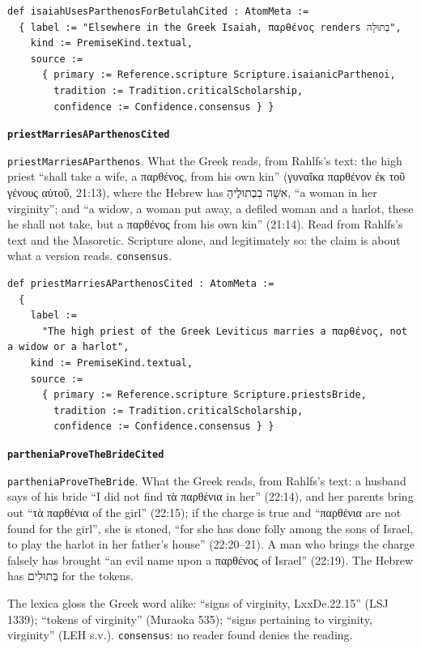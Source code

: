 \documentclass[11pt]{article}
\begin{document}
{\small\begin{verbatim}
def isaiahUsesParthenosForBetulahCited : AtomMeta :=
  { label := "Elsewhere in the Greek Isaiah, παρθένος renders בְּתוּלָה",
    kind := PremiseKind.textual,
    source :=
      { primary := Reference.scripture Scripture.isaianicParthenoi,
        tradition := Tradition.criticalScholarship,
        confidence := Confidence.consensus } }
\end{verbatim}}
\par\medskip\noindent\textbf{\texttt{priest\allowbreak{}Marries\allowbreak{}AParthenos\allowbreak{}Cited}}\par\nobreak\noindent
\texttt{priest\allowbreak{}Marries\allowbreak{}AParthenos}. What the Greek reads, from Rahlfs’s text: the high priest “shall take a wife, a παρθένος, from his own kin” (γυναῖκα παρθένον ἐκ τοῦ γένους αὐτοῦ, 21:13), where the Hebrew has אִשָּׁה בִבְתוּלֶיהָ, “a woman in her virginity”; and “a widow, a woman put away, a defiled woman and a harlot, these he shall not take, but a παρθένος from his own kin” (21:14). Read from Rahlfs’s text and the Masoretic. Scripture alone, and legitimately so: the claim is about what a version reads. \texttt{consensus}.

{\small\begin{verbatim}
def priestMarriesAParthenosCited : AtomMeta :=
  {
    label :=
      "The high priest of the Greek Leviticus marries a παρθένος, not a widow or a harlot",
    kind := PremiseKind.textual,
    source :=
      { primary := Reference.scripture Scripture.priestsBride,
        tradition := Tradition.criticalScholarship,
        confidence := Confidence.consensus } }
\end{verbatim}}
\par\medskip\noindent\textbf{\texttt{parthenia\allowbreak{}Prove\allowbreak{}The\allowbreak{}Bride\allowbreak{}Cited}}\par\nobreak\noindent
\texttt{parthenia\allowbreak{}Prove\allowbreak{}The\allowbreak{}Bride}. What the Greek reads, from Rahlfs’s text: a husband says of his bride “I did not find τὰ παρθένια in her” (22:14), and her parents bring out “τὰ παρθένια of the girl” (22:15); if the charge is true and “παρθένια are not found for the girl”, she is stoned, “for she has done folly among the sons of Israel, to play the harlot in her father’s house” (22:20–21). A man who brings the charge falsely has brought “an evil name upon a παρθένος of Israel” (22:19). The Hebrew has בְּתוּלִים for the tokens.

The lexica gloss the Greek word alike: “signs of virginity, LxxDe.22.15” (LSJ 1339); “tokens of virginity” (Muraoka 535); “signs pertaining to virginity, virginity” (LEH s.v.). \texttt{consensus}: no reader found denies the reading.
\end{document}
